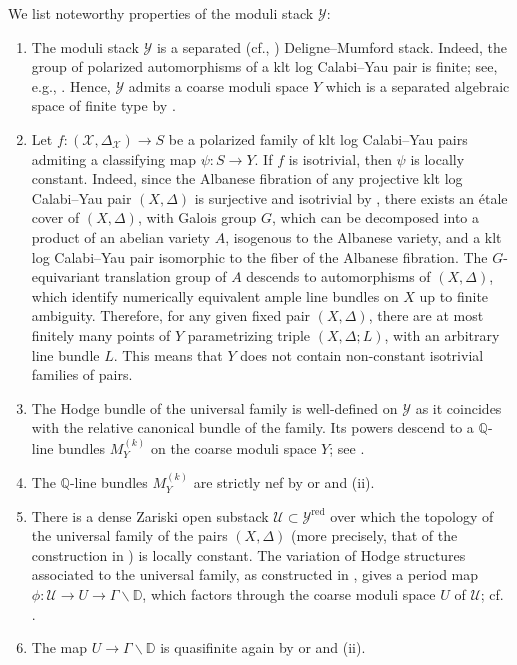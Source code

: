 \documentclass{amsart}
\newcommand{\bs}{\backslash}
\theoremstyle{definition}
\theoremstyle{remark}
\def\bD{\mathbb{D}}
\def\bQ{\mathbb{Q}}
\def\cU{\mathcal{U}}
\def\cY{\mathcal{Y}}
\numberwithin{equation}{section}
\begin{document}
We list noteworthy properties of the moduli stack $\cY$:
\begin{enumerate}[label=(\roman*)]
\item The moduli stack $\cY$ is a separated (cf., \cite[Thm.~11.40]{kbook}) Deligne--Mumford stack. Indeed, the group of polarized automorphisms of a klt log Calabi--Yau pair is finite; see, e.g., \cite[Prop.~10.1]{PZ2020}. Hence, $\cY$ admits a coarse moduli space $Y$ which is a separated algebraic space of finite type by \cite{KM1997}.
 \item Let $f \colon (\mathcal{X}, \Delta_{\mathcal{X}}) \to S$ be a polarized family of klt log Calabi--Yau pairs admiting a classifying map $\psi \colon S \to Y$. If $f$ is isotrivial, then $\psi$ is locally constant. Indeed, since the Albanese fibration of any projective klt log Calabi--Yau pair $(X, \Delta)$ is surjective and isotrivial by \cite[Cor.~A.14]{PZ2020}, there exists an \'{e}tale cover of $(X, \Delta)$, with Galois group $G$, which can be decomposed into a product of an abelian variety $A$, isogenous to the Albanese variety, and a klt log Calabi--Yau pair isomorphic to the fiber of the Albanese fibration. The $G$-equivariant translation group of $A$ descends to automorphisms of $(X, \Delta)$, which identify numerically equivalent ample line bundles on $X$ up to finite ambiguity. Therefore, for any given fixed pair $(X, \Delta)$, there are at most finitely many points of $Y$ parametrizing triple $(X, \Delta; L)$, with an arbitrary line bundle $L$.  This means that $Y$ does not contain non-constant isotrivial families of pairs. 
\item The Hodge bundle of the universal family is well-defined on $\cY$ as it coincides with the relative canonical bundle of the family. Its powers descend to a $\bQ$-line bundles $M^{(k)}_{Y}$ on the coarse moduli space $Y$; see \cite[Lem.~3.2]{KV04}. 
\item \label{item:stictlynef} The $\bQ$-line bundles $M^{(k)}_{Y}$ are strictly nef by \cite[Thm.~3.3]{Amb05} or \cite[Thm.~A.12]{PZ2020} and (ii).
\item There is a dense Zariski open substack $\cU \subset \cY^{\mathrm{red}}$ over which the topology of the universal family of the pairs $(X, \Delta)$ (more precisely, that of the construction in ) is locally constant. The variation of Hodge structures associated to the universal family, as constructed in , gives a period map $\phi \colon \cU \to U \to \Gamma\backslash \bD$, which factors through the coarse moduli space $U$ of $\cU$; cf. \cite[Proof of Cor.~7.3]{BBT23}.
\item \label{item:quasifinite} The map $U \to \Gamma\bs\bD$ is quasifinite again by \cite[Thm.~3.3]{Amb05} or \cite[Thm.~A.12]{PZ2020} and (ii).


\end{enumerate}
\end{document}
